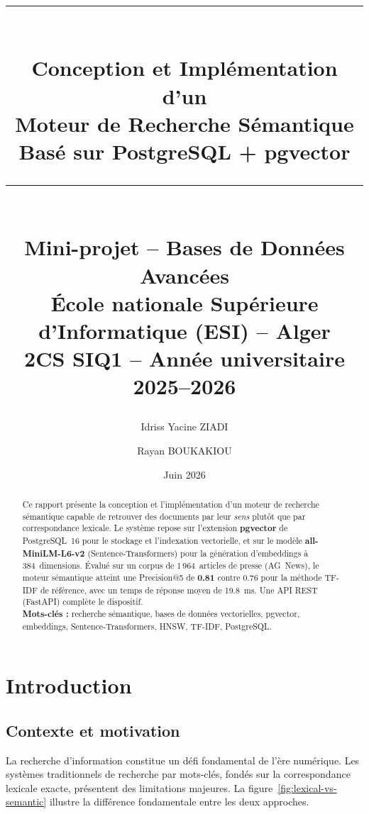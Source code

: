\documentclass[12pt,a4paper]{article}
\title{
    \vspace{-1cm}
    \rule{\textwidth}{1.5pt}\\[0.4cm]
    \textbf{\LARGE Conception et Impl\'{e}mentation d'un\\Moteur de Recherche S\'{e}mantique}\\[0.3cm]
    \large Bas\'{e} sur PostgreSQL + pgvector\\[0.3cm]
    \rule{\textwidth}{1.5pt}\\[0.5cm]
    \normalsize Mini-projet -- Bases de Donn\'{e}es Avanc\'{e}es\\
    \'{E}cole nationale Sup\'{e}rieure d'Informatique (ESI) -- Alger\\
    2CS SIQ1 -- Ann\'{e}e universitaire 2025--2026
}
\author{
    Idriss Yacine ZIADI \and Rayan BOUKAKIOU
}
\date{Juin 2026}
\begin{document}
\maketitle
\thispagestyle{empty}

\begin{abstract}
\noindent
Ce rapport pr\'{e}sente la conception et l'impl\'{e}mentation d'un moteur de recherche s\'{e}mantique capable de retrouver des documents par leur \textit{sens} plut\^{o}t que par correspondance lexicale. Le syst\`{e}me repose sur l'extension \textbf{pgvector} de PostgreSQL~16 pour le stockage et l'indexation vectorielle, et sur le mod\`{e}le \textbf{all-MiniLM-L6-v2} (Sentence-Transformers) pour la g\'{e}n\'{e}ration d'embeddings \`{a} 384~dimensions. \'{E}valu\'{e} sur un corpus de 1\,964~articles de presse (AG~News), le moteur s\'{e}mantique atteint une Precision@5 de \textbf{0.81} contre 0.76 pour la m\'{e}thode TF-IDF de r\'{e}f\'{e}rence, avec un temps de r\'{e}ponse moyen de 19.8~ms. Une API REST (FastAPI) compl\`{e}te le dispositif.\\[0.2cm]
\textbf{Mots-cl\'{e}s :} recherche s\'{e}mantique, bases de donn\'{e}es vectorielles, pgvector, embeddings, Sentence-Transformers, HNSW, TF-IDF, PostgreSQL.
\end{abstract}

\newpage
\tableofcontents
\newpage

\section{Introduction}

\subsection{Contexte et motivation}

La recherche d'information constitue un d\'{e}fi fondamental de l'\`{e}re num\'{e}rique. Les syst\`{e}mes traditionnels de recherche par mots-cl\'{e}s, fond\'{e}s sur la correspondance lexicale exacte, pr\'{e}sentent des limitations majeures. La figure~\ref{fig:lexical-vs-semantic} illustre la diff\'{e}rence fondamentale entre les deux approches.
\end{document}
